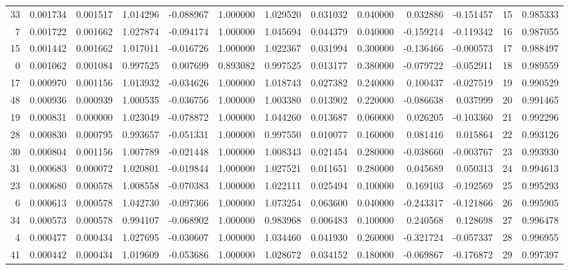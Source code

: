 \begin{tabular}{rrrrrrrrrrrrr}
33 & 0.001734 & 0.001517 & 1.014296 & -0.088967 & 1.000000 & 1.029520 & 0.031032 & 0.040000 & 0.032886 & -0.151457 & 15 & 0.985333 \\
7 & 0.001722 & 0.001662 & 1.027874 & -0.094174 & 1.000000 & 1.045694 & 0.044379 & 0.040000 & -0.159214 & -0.119342 & 16 & 0.987055 \\
15 & 0.001442 & 0.001662 & 1.017011 & -0.016726 & 1.000000 & 1.022367 & 0.031994 & 0.300000 & -0.136466 & -0.000573 & 17 & 0.988497 \\
0 & 0.001062 & 0.001084 & 0.997525 & 0.007699 & 0.893082 & 0.997525 & 0.013177 & 0.380000 & -0.079722 & -0.052911 & 18 & 0.989559 \\
17 & 0.000970 & 0.001156 & 1.013932 & -0.034626 & 1.000000 & 1.018743 & 0.027382 & 0.240000 & 0.100437 & -0.027519 & 19 & 0.990529 \\
48 & 0.000936 & 0.000939 & 1.000535 & -0.036756 & 1.000000 & 1.003380 & 0.013902 & 0.220000 & -0.086638 & 0.037999 & 20 & 0.991465 \\
19 & 0.000831 & 0.000000 & 1.023049 & -0.078872 & 1.000000 & 1.044260 & 0.013687 & 0.060000 & 0.026205 & -0.103360 & 21 & 0.992296 \\
28 & 0.000830 & 0.000795 & 0.993657 & -0.051331 & 1.000000 & 0.997550 & 0.010077 & 0.160000 & 0.081416 & 0.015864 & 22 & 0.993126 \\
30 & 0.000804 & 0.001156 & 1.007789 & -0.021448 & 1.000000 & 1.008343 & 0.021454 & 0.280000 & -0.038660 & -0.003767 & 23 & 0.993930 \\
31 & 0.000683 & 0.000072 & 1.020801 & -0.019844 & 1.000000 & 1.027521 & 0.011651 & 0.280000 & 0.045689 & 0.050313 & 24 & 0.994613 \\
23 & 0.000680 & 0.000578 & 1.008558 & -0.070383 & 1.000000 & 1.022111 & 0.025494 & 0.100000 & 0.169103 & -0.192569 & 25 & 0.995293 \\
6 & 0.000613 & 0.000578 & 1.042730 & -0.097366 & 1.000000 & 1.073254 & 0.063600 & 0.040000 & -0.243317 & -0.121866 & 26 & 0.995905 \\
34 & 0.000573 & 0.000578 & 0.994107 & -0.068902 & 1.000000 & 0.983968 & 0.006483 & 0.100000 & 0.240568 & 0.128698 & 27 & 0.996478 \\
4 & 0.000477 & 0.000434 & 1.027695 & -0.030607 & 1.000000 & 1.034460 & 0.041930 & 0.260000 & -0.321724 & -0.057337 & 28 & 0.996955 \\
41 & 0.000442 & 0.000434 & 1.019609 & -0.053686 & 1.000000 & 1.028672 & 0.034152 & 0.180000 & -0.069867 & -0.176872 & 29 & 0.997397 \\

\end{tabular}
